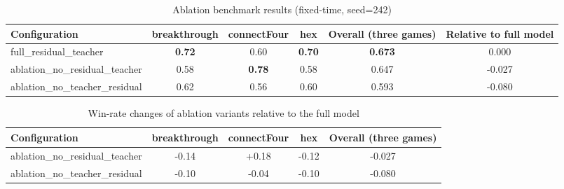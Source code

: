 \begin{table}[htbp]
\centering
\caption{Ablation benchmark results (fixed-time, seed=242)}
\label{tab:ablation_benchmark_seed242}
\begin{tabular}{lccccc}
\toprule
Configuration & breakthrough & connectFour & hex & Overall (three games) & Relative to full model \\
\midrule
full\_residual\_teacher & \textbf{0.72} & 0.60 & \textbf{0.70} & \textbf{0.673} & 0.000 \\
ablation\_no\_residual\_teacher & 0.58 & \textbf{0.78} & 0.58 & 0.647 & -0.027 \\
ablation\_no\_teacher\_residual & 0.62 & 0.56 & 0.60 & 0.593 & -0.080 \\
\bottomrule
\end{tabular}
\end{table}



\begin{table}[htbp]
\centering
\caption{Win-rate changes of ablation variants relative to the full model}
\label{tab:ablation_delta_vs_full_seed242}
\begin{tabular}{lcccc}
\toprule
Configuration & breakthrough & connectFour & hex & Overall (three games) \\
\midrule
ablation\_no\_residual\_teacher & -0.14 & +0.18 & -0.12 & -0.027 \\
ablation\_no\_teacher\_residual & -0.10 & -0.04 & -0.10 & -0.080 \\
\bottomrule
\end{tabular}
\end{table}
